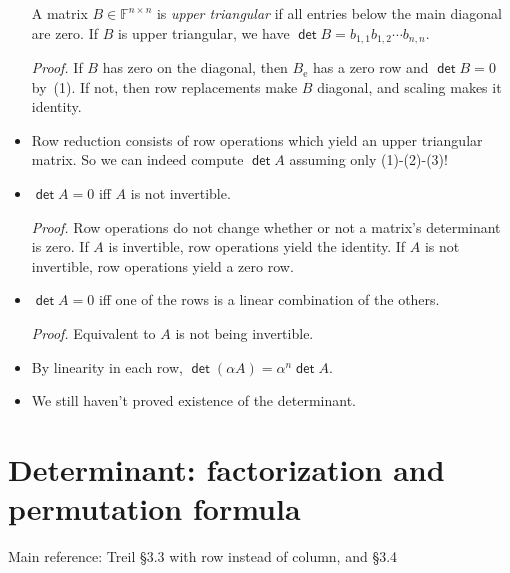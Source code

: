 \documentclass[11pt]{article}
\newcommand{\1}{\mathbf{1}}
\newcommand{\e}{{\mathrm{e}}}
\newcommand{\0}{\mathbf{0}}
\newcommand{\F}{\mathbb{F}}
\DeclareMathOperator{\mydet}{\mathsf{det}}
\begin{document}
\begin{itemize}
A matrix $B \in \F^{n \times n}$ is \emph{upper triangular} if all entries below the main diagonal are zero.
If $B$ is upper triangular, we have $\mydet B = b_{1,1}b_{1,2} \cdots b_{n,n}$.

\emph{Proof.}
If $B$ has zero on the diagonal, then $B_\e$ has a zero row and $\mydet B = 0$ by~(1).
If not, then row replacements make $B$ diagonal, and scaling makes it identity.
\item

Row reduction consists of row operations which yield an upper triangular matrix.
So we can indeed compute $\mydet A$ assuming only (1)-(2)-(3)!

\item

$\mydet A = 0$ iff $A$ is not invertible.

\emph{Proof.}
Row operations do not change whether or not a matrix's determinant is zero.
If $A$ is invertible, row operations yield the identity.
If $A$ is not invertible, row operations yield a zero row.

\item

$\mydet A = 0$ iff one of the rows is a linear combination of the others.

\emph{Proof.}
Equivalent to $A$ is not being invertible.

\item

By linearity in each row, $\mydet(\alpha A) = \alpha^n \mydet A$.

\item
We still haven't proved existence of the determinant.

\end{itemize}


\clearpage
\section{Determinant: factorization and permutation formula}

Main reference:
Treil
\S3.3 with row instead of column, and \S3.4
\end{document}
